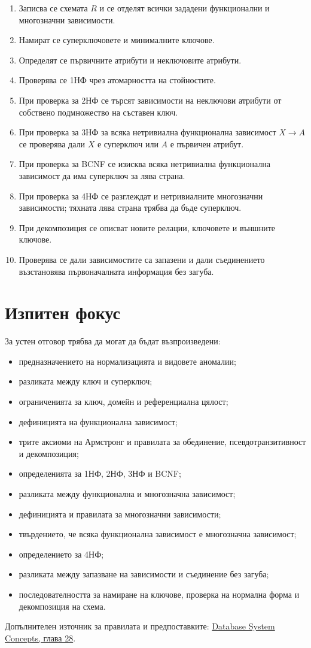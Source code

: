 \begin{enumerate}
    \item Записва се схемата $R$ и се отделят всички зададени функционални и многозначни зависимости.
    \item Намират се суперключовете и минималните ключове.
    \item Определят се първичните атрибути и неключовите атрибути.
    \item Проверява се 1НФ чрез атомарността на стойностите.
    \item При проверка за 2НФ се търсят зависимости на неключови атрибути от собствено подмножество на съставен ключ.
    \item При проверка за 3НФ за всяка нетривиална функционална зависимост $X\to A$ се проверява дали $X$ е суперключ или $A$ е първичен атрибут.
    \item При проверка за BCNF се изисква всяка нетривиална функционална зависимост да има суперключ за лява страна.
    \item При проверка за 4НФ се разглеждат и нетривиалните многозначни зависимости; тяхната лява страна трябва да бъде суперключ.
    \item При декомпозиция се описват новите релации, ключовете и външните ключове.
    \item Проверява се дали зависимостите са запазени и дали съединението възстановява първоначалната информация без загуба.
\end{enumerate}

\section{Изпитен фокус}\label{s:24.2}

За устен отговор трябва да могат да бъдат възпроизведени:

\begin{itemize}
    \item предназначението на нормализацията и видовете аномалии;
    \item разликата между ключ и суперключ;
    \item ограниченията за ключ, домейн и референциална цялост;
    \item дефиницията на функционална зависимост;
    \item трите аксиоми на Армстронг и правилата за обединение, псевдотранзитивност и декомпозиция;
    \item определенията за 1НФ, 2НФ, 3НФ и BCNF;
    \item разликата между функционална и многозначна зависимост;
    \item дефиницията и правилата за многозначни зависимости;
    \item твърдението, че всяка функционална зависимост е многозначна зависимост;
    \item определението за 4НФ;
    \item разликата между запазване на зависимости и съединение без загуба;
    \item последователността за намиране на ключове, проверка на нормална форма и декомпозиция на схема.
\end{itemize}

\begin{remark}
Допълнителен източник за правилата и предпоставките: \href{https://db-book.com/online-chapters-dir/28.pdf}{Database System Concepts, глава 28}.
\end{remark}

